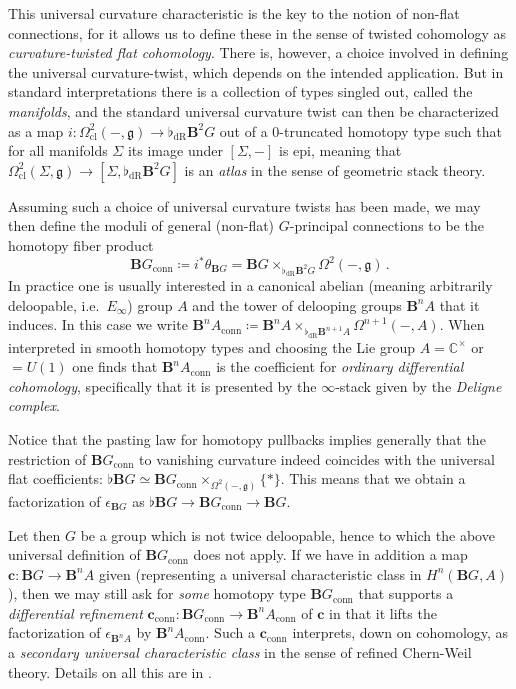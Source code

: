 \documentclass[copyright]{eptcs}
\begin{document}
This universal curvature characteristic is the key to the notion of non-flat connections,
for it allows us to define these in the sense of twisted cohomology as
\emph{curvature-twisted flat cohomology}.
There is, however, a choice involved in defining the universal curvature-twist, which depends
on the intended application. But in standard interpretations there is a collection
of types singled out, called the \emph{manifolds}, and the standard universal
curvature twist can then be characterized as a map
$i : \Omega^{2}_{\mathrm{cl}}(-,\mathfrak{g}) \to \flat_{\mathrm{dR}}\mathbf{B}^2 G$ out of a 0-truncated
homotopy type such that for all
manifolds $\Sigma$ its image under $[\Sigma,-]$ is epi, meaning that
$\Omega^2_{\mathrm{cl}}(\Sigma,\mathfrak{g}) \to [\Sigma, \flat_{\mathrm{dR}}\mathbf{B}^2 G]$
is an \emph{atlas} in the sense of geometric stack theory.

Assuming such a choice of universal curvature twists has been made, we may then define
the moduli
of general (non-flat) $G$-principal connections to be the homotopy fiber product
\[
  \mathbf{B}G_{\mathrm{conn}}
  \coloneqq
  i^* \theta_{\mathbf{B}G}
  =
  \mathbf{B}G \times_{\flat_{\mathrm{dR}} \mathbf{B}^2 G} \Omega^2(-,\mathfrak{g})
  \,.
\]
In practice one is usually interested in a canonical abelian (meaning arbitrarily deloopable, i.e.\ $E_\infty$)
group $A$ and the tower of delooping groups $\mathbf{B}^n A$ that it induces.
In this case we write
$
  \mathbf{B}^n A_{\mathrm{conn}}
  \coloneqq
  \mathbf{B}^n A \times_{\flat_{\mathrm{dR}} \mathbf{B}^{n+1} A} \Omega^{n+1}(-,A)
$.
When interpreted in smooth homotopy types and choosing the Lie group
$A = \mathbb{C}^\times$ or $= U(1)$ one finds that $\mathbf{B}^n A_{\mathrm{conn}}$
is the coefficient for \emph{ordinary differential cohomology}, specifically that it is presented
by the $\infty$-stack given by the \emph{Deligne complex}.

Notice that the pasting law for homotopy pullbacks implies generally that the restriction of
$\mathbf{B} G_{\mathrm{conn}}$ to
vanishing curvature indeed coincides with the universal flat coefficients:
$\flat \mathbf{B}G \simeq \mathbf{B}G_{\mathrm{conn}} \times_{\Omega^2(-,\mathfrak{g})} \{*\}$.
This means that we obtain a factorization
of $\epsilon_{\mathbf{B} G}$ as $\flat \mathbf{B}G \to \mathbf{B}G_{\mathrm{conn}} \to \mathbf{B}G$.

Let then $G$ be a group which is not twice deloopable, hence to which the above universal definition
of $\mathbf{B}G_{\mathrm{conn}}$ does not apply. If we have in addition a map
$\mathbf{c} : \mathbf{B}G \to \mathbf{B}^n A$ given (representing a
universal characteristic class in
$H^n(\mathbf{B}G, A)$), then we may still ask for \emph{some} homotopy type
$\mathbf{B}G_{\mathrm{conn}}$ that supports a \emph{differential refinement}
$
 \mathbf{c}_{\mathrm{conn}} : \mathbf{B}G_{\mathrm{conn}} \to \mathbf{B}^n A_{\mathrm{conn}}
$
of
$\mathbf{c}$
in that it lifts the factorization of $\epsilon_{\mathbf{B}^n A}$ by
$\mathbf{B}^n A_{\mathrm{conn}}$.
Such a $\mathbf{c}_{\mathrm{conn}}$ interprets, down on cohomology, as a
\emph{secondary universal characteristic class} in the sense of refined Chern-Weil theory.
Details on all this are in \cite{FSSt, SchreiberCohesion}.
\end{document}
